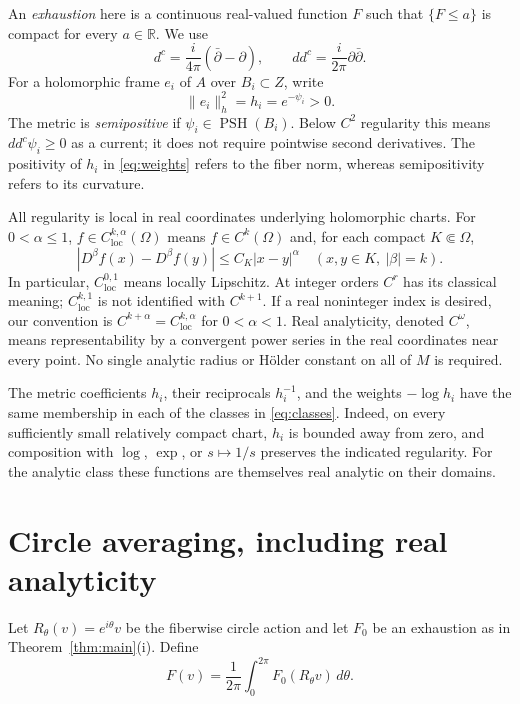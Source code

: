\documentclass[11pt]{amsart}
\theoremstyle{definition}
\theoremstyle{remark}
\numberwithin{equation}{section}
\newcommand{\R}{\mathbb R}
\newcommand{\PSH}{\operatorname{PSH}}
\newcommand{\loc}{\mathrm{loc}}
\newcommand{\ddc}{dd^c}
\newcommand{\barp}{\bar\partial}
\begin{document}
An \emph{exhaustion} here is a continuous real-valued function $F$
such that $\{F\le a\}$ is compact for every $a\in\R$. We use
\[
d^c=\frac{i}{4\pi}(\barp-\partial),\qquad
\ddc=\frac{i}{2\pi}\partial\barp.
\]
For a holomorphic frame $e_i$ of $A$ over $B_i\subset Z$, write
\begin{equation}\label{eq:weights}
\|e_i\|_h^2=h_i=e^{-\psi_i}>0.
\end{equation}
The metric is \emph{semipositive} if $\psi_i\in\PSH(B_i)$.
Below $C^2$ regularity this means $\ddc\psi_i\ge0$ as a current;
it does not require pointwise second derivatives. The positivity of
$h_i$ in \eqref{eq:weights} refers to the fiber norm, whereas
semipositivity refers to its curvature.

All regularity is local in real coordinates underlying holomorphic
charts. For $0<\alpha\le1$, $f\in C^{k,\alpha}_{\loc}(\Omega)$ means
$f\in C^k(\Omega)$ and, for each compact $K\Subset\Omega$,
\[
|D^\beta f(x)-D^\beta f(y)|\le C_K|x-y|^\alpha
\quad(x,y\in K,\ |\beta|=k).
\]
In particular, $C^{0,1}_{\loc}$ means locally Lipschitz. At integer
orders $C^r$ has its classical meaning; $C^{k,1}_{\loc}$ is not
identified with $C^{k+1}$. If a real noninteger index is desired, our
convention is $C^{k+\alpha}=C^{k,\alpha}_{\loc}$ for $0<\alpha<1$.
Real analyticity, denoted $C^\omega$, means representability by a
convergent power series in the real coordinates near every point.
No single analytic radius or H\"older constant on all of $M$ is required.

The metric coefficients $h_i$, their reciprocals $h_i^{-1}$, and the
weights $-\log h_i$ have the same membership in each of the classes in
\eqref{eq:classes}. Indeed, on every sufficiently small relatively
compact chart, $h_i$ is bounded away from zero, and composition with
$\log$, $\exp$, or $s\mapsto1/s$ preserves the indicated regularity.
For the analytic class these functions are themselves real analytic
on their domains.

\section{Circle averaging, including real analyticity}

Let $R_\theta(v)=e^{i\theta}v$ be the fiberwise circle action and let
$F_0$ be an exhaustion as in Theorem~\ref{thm:main}(i). Define
\begin{equation}\label{eq:average}
F(v)=\frac1{2\pi}\int_0^{2\pi}F_0(R_\theta v)\,d\theta.
\end{equation}
\end{document}
